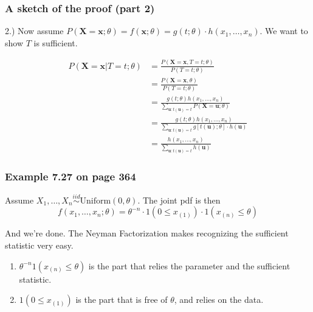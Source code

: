 \documentclass{beamer}
\begin{document}
\begin{frame}
\frametitle{A sketch of the proof (part 2)}

2.) Now assume $P(\mathbf{X} = \mathbf{x}; \theta) = f(\mathbf{x}; \theta) = g(t;\theta) \cdot h(x_1, \ldots, x_n)$. We want to show $T$ is sufficient.

\begin{align*}
P(\mathbf{X} = \mathbf{x}|T = t; \theta) &= \frac{P(\mathbf{X} = \mathbf{x}, T = t; \theta)}{P(T=t;\theta)} \\
&= \frac{P(\mathbf{X}=\mathbf{x}, \theta)}{P(T=t;\theta)} \\
&= \frac{g(t;\theta) h(x_1, \ldots, x_n) }{ \sum_{\mathbf{u} : t(\mathbf{u}) = t} P(\mathbf{X} = \mathbf{u}; \theta)} \\
&= \frac{g(t;\theta) h(x_1, \ldots, x_n) }{ \sum_{\mathbf{u} : t(\mathbf{u}) = t} g[t( \mathbf{u}) ;\theta] \cdot h(\mathbf{u}) } \\
&= \frac{ h(x_1, \ldots, x_n) }{ \sum_{\mathbf{u} : t(\mathbf{u}) = t}   h(\mathbf{u}) } 
\end{align*}
\end{frame}
\begin{frame}
\frametitle{Example 7.27 on page 364}

Assume $X_1, \ldots, X_n \overset{iid}{\sim} \text{Uniform}(0, \theta)$. The joint pdf is then 
\[
f(x_1, \ldots, x_n ; \theta) = \theta^{-n} \cdot 1(0 \le x_{(1)}) \cdot 1(x_{(n)} \le \theta)
\]

And we're done. The Neyman Factorization makes recognizing the sufficient statistic very easy.
\begin{enumerate}
\item $\theta^{-n} 1(x_{(n)} \le \theta)$ is the part that relies the parameter and the sufficient statistic. 
\item $1(0 \le x_{(1)}) $ is the part that is free of $\theta$, and relies on the data.
\end{enumerate}
\end{frame}
\end{document}
